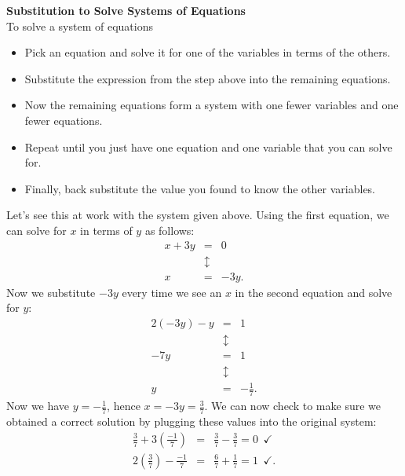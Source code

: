 \begin{tcolorbox}
{\bf Substitution to Solve Systems of Equations}\\
To solve a system of equations
\begin{itemize}
\item Pick an equation and solve it for one of the variables in terms of the others. 
\item Substitute the expression from the step above into the remaining equations.
\item Now the remaining equations form a system with one fewer variables and one fewer equations. 
\item Repeat until you just have one equation and one variable that you can solve for.
\item Finally, back substitute the value you found to know the other variables.
\end{itemize}
\end{tcolorbox}

Let's see this at work with the system given above. Using the first equation, we can solve for $x$ in terms of $y$ as follows:
\begin{eqnarray*}
x+3y & = & 0\\
\ & \updownarrow & \\
x & = & -3y.
\end{eqnarray*}
Now we substitute $-3y$ every time we see an $x$ in the second equation and solve for $y$:
\begin{eqnarray*}
2(-3y) - y & = & 1\\
\ & \updownarrow & \\
-7y & = & 1\\
\ & \updownarrow & \\
y & = & -\frac{1}{7}.
\end{eqnarray*}
Now we have $y=-\frac{1}{7}$, hence $x = -3y = \frac{3}{7}$. We can now check to make sure we obtained a correct solution by plugging these values into the original system:
\begin{eqnarray*}
\frac{3}{7} +3\left(\frac{-1}{7}\right) & = & \frac{3}{7}-\frac{3}{7} = 0 \phantom{s} \checkmark\\
2\left(\frac{3}{7}\right) - \frac{-1}{7} & = & \frac{6}{7}+\frac{1}{7} = 1
\phantom{s} \checkmark.
\end{eqnarray*} 

\par
 
